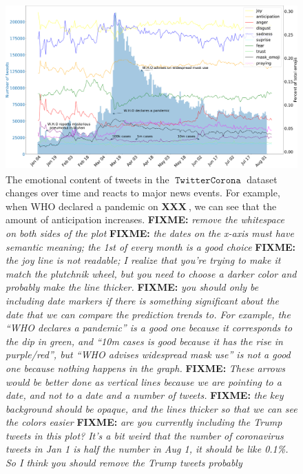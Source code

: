 \documentclass[11pt]{article}
\newcommand{\fixme}[1]{{\color{red} \textbf{FIXME:} {\textit {#1}}}}
\newcommand{\XXX}{\textbf{XXX}~}
\DeclareMathOperator{\corona}{\texttt{TwitterCorona}}
\begin{document}
\begin{figure}
    \centering
    \includegraphics[width=\textwidth,height=2.5in]{images/corona_dataset_graph.pdf}
    \caption{
        The emotional content of tweets in the $\corona$ dataset changes over time and reacts to major news events.
        For example, when WHO declared a pandemic on $\XXX$, we can see that the amount of anticipation increases.
        \fixme{remove the whitespace on both sides of the plot}
        \fixme{the dates on the x-axis must have semantic meaning;
        the 1st of every month is a good choice}
        \fixme{the joy line is not readable; I realize that you're trying to make it match the plutchnik wheel, but you need to choose a darker color and probably make the line thicker.}
        \fixme{you should only be including date markers if there is something significant about the date that we can compare the prediction trends to.  For example, the ``WHO declares a pandemic'' is a good one because it corresponds to the dip in green, and ``10m cases is good because it has the rise in purple/red'', but ``WHO advises widespread mask use'' is not a good one because nothing happens in the graph.}
        \fixme{These arrows would be better done as vertical lines because we are pointing to a date, and not to a date and a number of tweets.}
        \fixme{the key background should be opaque, and the lines thicker so that we can see the colors easier}
        \fixme{are you currently including the Trump tweets in this plot?  It's a bit weird that the number of coronavirus tweets in Jan 1 is half the number in Aug 1, it should be like 0.1\%.  So I think you should remove the Trump tweets probably}
    }
    \label{fig:tweets_per_day_sent}
\end{figure}
\end{document}

